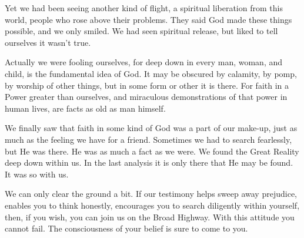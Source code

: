 \begin{biblechapter}
    Yet we had been seeing another kind of flight, 
a spiritual liberation from this world, 
people who rose above their problems. 
They said God made these things possible, and we only smiled. 
We had seen spiritual release, 
but liked to tell ourselves it wasn't true.

Actually we were fooling ourselves, 
for deep down in every man, woman, and child, is the fundamental idea of God. 
It may be obscured by calamity, by pomp, by worship of other things, 
but in some form or other it is there. 
For faith in a Power greater than ourselves, 
and miraculous demonstrations of that power in human lives,
are facts as old as man himself.

We finally saw that faith in some kind of God was a part of our make-up, 
just as much as the feeling we have for a friend. 
Sometimes we had to search fearlessly, but He was there. 
He was as much a fact as we were. 
We found the Great Reality deep down within us. 
In the last analysis it is only there that He may be found. 
It was so with us.

We can only clear the ground a bit. 
If our testimony helps sweep away prejudice, 
enables you to think honestly, 
encourages you to search diligently within yourself, 
then, if you wish, you can join us on the Broad Highway. 
With this attitude you cannot fail. 
The consciousness of your belief is sure to come to you.
\end{biblechapter}


